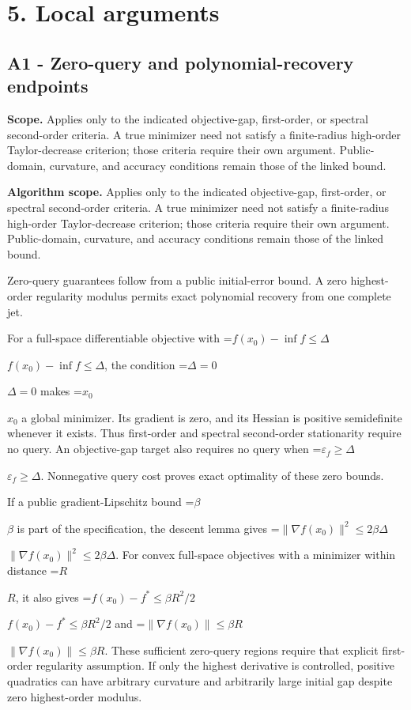 \documentclass[10pt,a4paper]{article}
\newcommand{\AtlasMath}[1]{\par\begingroup\centering\setbox0=\hbox{$\displaystyle #1$}\ifdim\wd0>1.4\linewidth\typeout{ATLAS WIDE FORMULA: \the\wd0}\fi\ifdim\wd0>\linewidth\resizebox{\linewidth}{!}{\box0}\else\box0\fi\par\endgroup}
\newcommand{\AtlasInlineMath}[1]{\begingroup\setbox0=\hbox{$#1$}\ifdim\wd0>.4\linewidth\endgroup\AtlasMath{#1}\else\endgroup$#1$\fi}
\begin{document}
\section{5. Local arguments}
\subsection{A1 - Zero-query and polynomial-recovery endpoints}
\textbf{Scope.} Applies only to the indicated objective-gap, first-order, or spectral second-order criteria. A true minimizer need not satisfy a finite-radius high-order Taylor-decrease criterion; those criteria require their own argument. Public-domain, curvature, and accuracy conditions remain those of the linked bound.

\textbf{Algorithm scope.} Applies only to the indicated objective-gap, first-order, or spectral second-order criteria. A true minimizer need not satisfy a finite-radius high-order Taylor-decrease criterion; those criteria require their own argument. Public-domain, curvature, and accuracy conditions remain those of the linked bound.

Zero-query guarantees follow from a public initial-error bound. A zero highest-order regularity modulus permits exact polynomial recovery from one complete jet.

For a full-space differentiable objective with \AtlasInlineMath{f(x_0)-\inf f\le\Delta}, the condition \AtlasInlineMath{\Delta=0} makes \AtlasInlineMath{x_0} a global minimizer. Its gradient is zero, and its Hessian is positive semidefinite whenever it exists. Thus first-order and spectral second-order stationarity require no query. An objective-gap target also requires no query when \AtlasInlineMath{\varepsilon_f\ge\Delta}. Nonnegative query cost proves exact optimality of these zero bounds.

If a public gradient-Lipschitz bound \AtlasInlineMath{\beta} is part of the specification, the descent lemma gives \AtlasInlineMath{\|\nabla f(x_0)\|^2\le2\beta\Delta}. For convex full-space objectives with a minimizer within distance \AtlasInlineMath{R}, it also gives \AtlasInlineMath{f(x_0)-f^*\le\beta R^2/2} and \AtlasInlineMath{\|\nabla f(x_0)\|\le\beta R}. These sufficient zero-query regions require that explicit first-order regularity assumption. If only the highest derivative is controlled, positive quadratics can have arbitrary curvature and arbitrarily large initial gap despite zero highest-order modulus.
\end{document}
